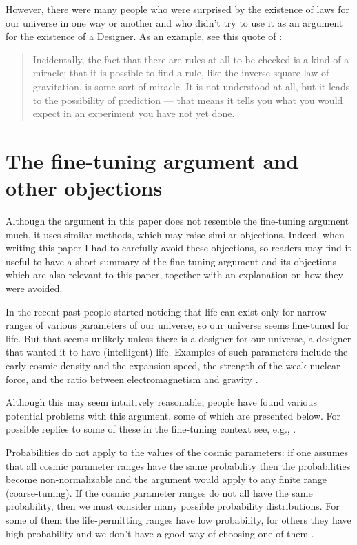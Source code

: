 \documentclass[a4paper
,draft
]{article}
\newcommand{\ghilimele}[1]{``#1"}
\begin{document}
However, there were many people who were surprised by the existence of laws
for our universe in one way or another and who didn't try to use it
as an argument for the existence of a Designer.
As an example, see this quote of \textcite{Feynman2009}:
\begin{quote}
Incidentally, the fact that there are rules at all to be checked
is a kind of a miracle; that it is possible to find a rule,
like the inverse square law of gravitation, is some sort of miracle.
It is not understood at all, but it leads to the possibility of
prediction --- that means it tells you what you would expect in
an experiment you have not yet done.
\end{quote}


\section{The fine-tuning argument and other objections}

Although the argument in this paper does not resemble the fine-tuning argument
much, it uses similar methods, which may raise similar objections. Indeed,
when writing this paper I had to carefully avoid these objections, so readers
may find it useful to have a short summary of the fine-tuning argument and its
objections which are also relevant to this paper, together with an explanation
on how they were avoided.

In the recent past people started noticing that life can exist only for
narrow ranges of various parameters of our universe, so our universe
seems fine-tuned for life.
But that seems unlikely unless there is a designer for our universe,
a designer that wanted it to have (intelligent) life.
Examples of such parameters include the early cosmic density and
the expansion speed, the strength of the weak nuclear force, and
the ratio between electromagnetism and gravity \parencite{Leslie2003}.

Although this may seem intuitively reasonable, people have found various
potential problems with this argument, some of which are presented below.
For possible replies to some of these in the fine-tuning context see,
e.g., \textcites{Leslie2003}{Swinburne2003}{Monton2006}{Kotzen2012}.

Probabilities do not apply to the values of the cosmic parameters:
if one assumes that all cosmic parameter ranges have the same probability
then the probabilities become non-normalizable and the argument
would apply to any finite range (coarse-tuning).
If the cosmic parameter ranges do not all have the same probability,
then we must consider many possible probability distributions.
For some of them the life-permitting ranges have low probability,
for others they have high probability and we don't have a good way
of choosing one of them \parencites{Manson2009}{McGrew2001}.
\end{document}
